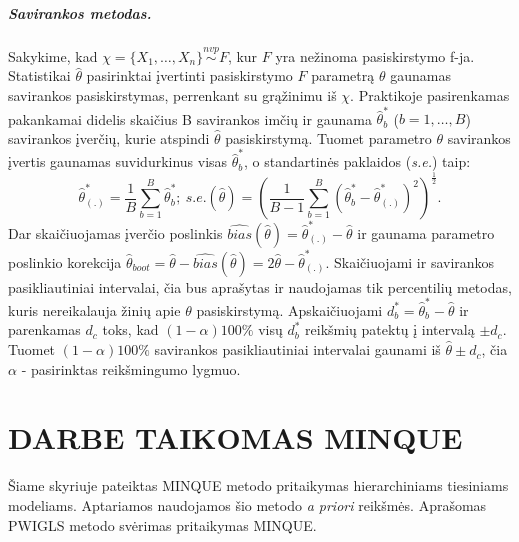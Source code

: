 \documentclass[11pt,a4paper]{article}
\begin{document}
\subparagraph{Savirankos metodas.} Sakykime, kad $\chi = \{X_1,\dots,X_n\}\stackrel{nvp}{\sim}F$, kur $F$ yra nežinoma pasiskirstymo f-ja. Statistikai $\hat{\theta}$ pasirinktai įvertinti pasiskirstymo $F$ parametrą $\theta$ gaunamas savirankos pasiskirstymas, perrenkant su grąžinimu iš $\chi$. Praktikoje pasirenkamas pakankamai didelis skaičius B savirankos imčių ir gaunama $\hat{\theta}^*_b$ ($b=1,\dots,B$) savirankos įverčių, kurie atspindi $\hat{\theta}$ pasiskirstymą. Tuomet parametro $\theta$ savirankos įvertis gaunamas suvidurkinus visas $\hat{\theta}^*_b$, o standartinės paklaidos (\textit{s.e.}) taip:
\[
\hat{\theta}^*_{(.)}=\frac{1}{B}\sum^B_{b=1}\hat{\theta}^*_b; \
s.e.(\hat{\theta})=\left(\frac{1}{B-1}\sum^B_{b=1}(\hat{\theta}^*_b - \hat{\theta}^*_{(.)})^2\right)^{\frac{1}{2}}.
\]
Dar skaičiuojamas įverčio poslinkis $\widehat{bias}(\hat{\theta})=\hat{\theta}^*_{(.)}-\hat{\theta}$ ir gaunama parametro poslinkio korekcija $\hat{\theta}_{boot}=\hat{\theta}-\widehat{bias}(\hat{\theta})=2\hat{\theta}-\hat{\theta}^*_{(.)}$. Skaičiuojami ir savirankos pasikliautiniai intervalai, čia bus aprašytas ir naudojamas tik percentilių metodas, kuris nereikalauja žinių apie $\theta$ pasiskirstymą. Apskaičiuojami $d^*_b=\hat{\theta}^*_b-\hat{\theta}$ ir parenkamas $d_c$ toks, kad $(1-\alpha)100\%$ visų $d^*_b$ reikšmių patektų į intervalą $\pm d_c$. Tuomet $(1-\alpha)100\%$ savirankos pasikliautiniai intervalai gaunami iš $\hat{\theta}\pm d_c$, čia $\alpha$ - pasirinktas reikšmingumo lygmuo.

\newpage
\section{DARBE TAIKOMAS MINQUE} \label{sec:hlmminque}
\indent Šiame skyriuje pateiktas MINQUE metodo pritaikymas hierarchiniams tiesiniams modeliams. Aptariamos naudojamos šio metodo \textit{a priori} reikšmės. Aprašomas PWIGLS metodo svėrimas pritaikymas MINQUE.
\end{document}
